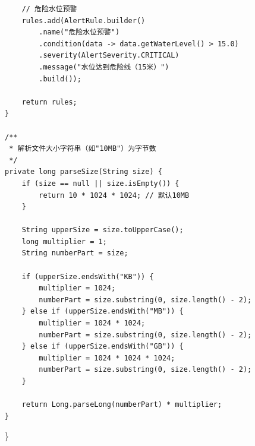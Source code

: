 \begin{verbatim}
    // 危险水位预警
    rules.add(AlertRule.builder()
        .name("危险水位预警")
        .condition(data -> data.getWaterLevel() > 15.0)
        .severity(AlertSeverity.CRITICAL)
        .message("水位达到危险线（15米）")
        .build());
    
    return rules;
}

/**
 * 解析文件大小字符串（如"10MB"）为字节数
 */
private long parseSize(String size) {
    if (size == null || size.isEmpty()) {
        return 10 * 1024 * 1024; // 默认10MB
    }
    
    String upperSize = size.toUpperCase();
    long multiplier = 1;
    String numberPart = size;
    
    if (upperSize.endsWith("KB")) {
        multiplier = 1024;
        numberPart = size.substring(0, size.length() - 2);
    } else if (upperSize.endsWith("MB")) {
        multiplier = 1024 * 1024;
        numberPart = size.substring(0, size.length() - 2);
    } else if (upperSize.endsWith("GB")) {
        multiplier = 1024 * 1024 * 1024;
        numberPart = size.substring(0, size.length() - 2);
    }
    
    return Long.parseLong(numberPart) * multiplier;
}
\end{verbatim}

\}

